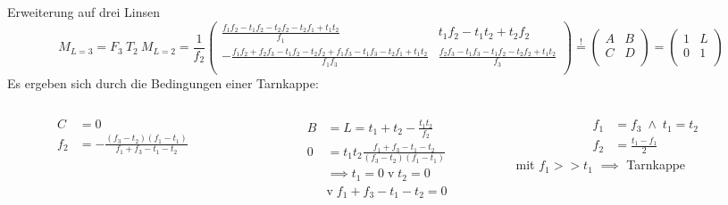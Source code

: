 \begin{frame}{Erweiterung auf drei Linsen}
  \begin{equation*}
    M_{L=3} = F_3\:T_2\:M_{L=2} = \frac{1}{f_2}
    \begin{pmatrix}
      \frac{f_1f_2-t_1f_2-t_2f_2-t_2f_1+t_1t_2}{f_1} & t_1f_2-t_1t_2+t_2f_2 \\
      -\frac{f_1f_2+f_2f_3-t_1f_2-t_2f_2+f_1f_3-t_1f_3-t_2f_1+t_1t_2}{f_1f_3}
      & \frac{f_2f_3-t_1f_3-t_1f_2-t_2f_2+t_1t_2}{f_3} \\
    \end{pmatrix}
    \stackrel{!}{=}
    \begin{pmatrix} A & B \\ C & D \\ \end{pmatrix} =
    \begin{pmatrix} 1 & L \\ 0 & 1 \\ \end{pmatrix}
  \end{equation*}
  Es ergeben sich durch die Bedingungen einer Tarnkappe:
  \begin{columns}
    \begin{column}{0.32\textwidth}
      \begin{align*}
        C &= 0 \\
        f_2 &= -\frac{(f_3-t_2)(f_1-t_1)}{f_1+f_3-t_1-t_2}
      \end{align*}
    \end{column}
    \begin{column}{0.32\textwidth}
      \begin{align*}
        B &= L = t_1 + t_2 - \frac{t_1t_2}{f_2} \\
        0 &= t_1 t_2 \frac{f_1+f_3-t_1-t_2}{(f_3-t_2)(f_1-t_1)}\\
        &\implies t_1 = 0\;\text{v}\;t_2 = 0 \\
        &\text{v}\;f_1+f_3-t_1-t_2 = 0
      \end{align*}
    \end{column}
    \begin{column}{0.32\textwidth}
      \begin{align*}
        f_1 &= f_3 \;\wedge\; t_1 = t_2 \\
        f_2 &= \frac{t_1-f_1}{2}
      \end{align*}
      mit $f_1>\!>t_1$ $\implies$ Tarnkappe
    \end{column}
  \end{columns}
\end{frame}

